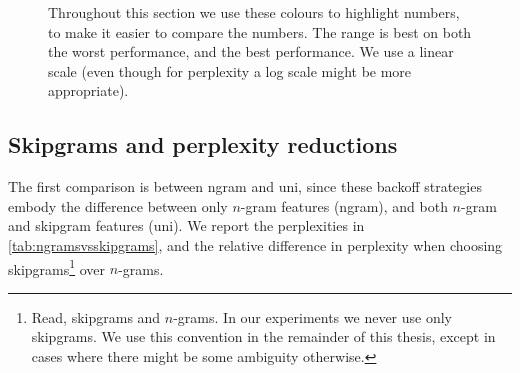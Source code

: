 \begin{figure}
\caption{Throughout this section we use these colours to highlight numbers, to make it easier to compare the numbers. The range is best on both the \textcolor{worstclr!50}{worst performance}, and the \textcolor{bestclr!50}{best performance}. We use a linear scale (even though for perplexity a log scale might be more appropriate).}
\label{fig:colourrange}
\end{figure}

\subsection{Skipgrams and perplexity reductions}
The first comparison is between \textsf{ngram} and \textsf{uni}, since these backoff strategies embody the difference between only $n$-gram features (\textsf{ngram}), and both $n$-gram and skipgram features (\textsf{uni}). We report the perplexities in \cref{tab:ngramsvsskipgrams}, and the relative difference in perplexity when choosing skipgrams\footnote{Read, skipgrams and $n$-grams. In our experiments we never use only skipgrams. We use this convention in the remainder of this thesis, except in cases where there might be some ambiguity otherwise.} over $n$-grams.

